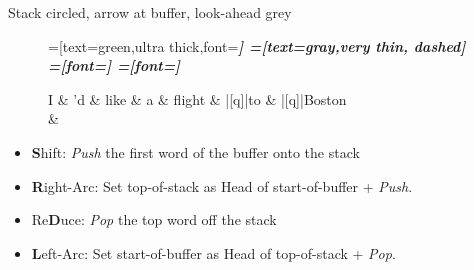 \documentclass{lecture}
\begin{document}
\begin{plain}{Stack circled, arrow at buffer, look-ahead grey}
\begin{figure}
    \centering
    \begin{dependency}[theme=simple]
    =[text=green,ultra thick,font=\bfseries\itshape]
    =[text=gray,very thin, dashed]
    =[font=\bfseries\itshape]
    =[font=\itshape]
    \begin{deptext}[column sep=.075cm, row sep=.1ex]
        I \& 'd \& like \& a \& flight \& |[q]|to \& |[q]|Boston \\
         \& \\
    \end{deptext}
\end{dependency}
\end{figure}
    \begin{itemize}
        \item \textbf{S}hift: \emph{Push} the first word of the buffer onto the stack
    \item \textbf{R}ight-Arc: Set top-of-stack as Head of start-of-buffer + \emph{Push}.
    \item Re\textbf{D}uce: \emph{Pop} the top word off the stack
    \item \textbf{L}eft-Arc: Set start-of-buffer as Head of top-of-stack + \emph{Pop}.
    \end{itemize}
\end{plain}
\end{document}
